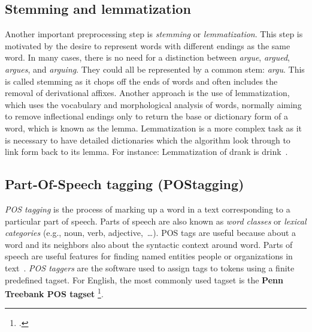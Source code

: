\subsection{Stemming and  lemmatization}
Another important preprocessing step is \emph{stemming} or \emph{lemmatization}. This step is motivated by the desire to represent words with different endings as the same word.
In many cases, there is no need for a distinction between \emph{argue}, \emph{argued}, \emph{argues}, and \emph{arguing}. They could all be represented by a common stem: \emph{argu}. This is called stemming as it chops off the ends of words and often includes the removal of derivational affixes. Another approach is the use of lemmatization, which uses the vocabulary and morphological analysis of words, normally aiming to remove inflectional endings only\added{,}  to return the base or dictionary form of a word, which is known as the lemma. Lemmatization is a more complex task as it is necessary to have detailed dictionaries which the algorithm  look through to link  form back to its lemma. For instance:
Lemmatization of drank is drink~.

\subsection{Part-Of-Speech tagging (POStagging)}
\emph{POS tagging} is the process of marking up a word in a text corresponding to a particular part of speech. Parts of speech are also known as \emph{word classes} or \emph{lexical categories} (e.g., noun, verb, adjective,~\dots). POS tags are useful because  about a word and its neighbors  also about the syntactic context around  word. Parts of speech are useful features for finding named entities  people or organizations in text~. \emph{POS taggers} are the software used to assign tags to tokens using a finite predefined tagset. For English, the most commonly used tagset is the \textbf{Penn Treebank POS tagset} \footcite{https://www.ling.upenn.edu/courses/Fall_2003/ling001/penn_treebank_pos.html}. 

